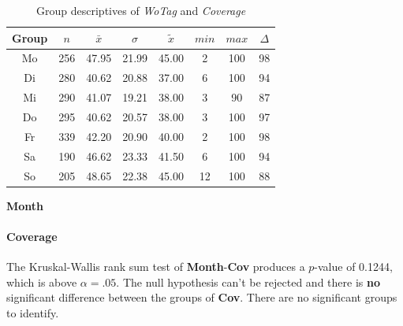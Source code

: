 \begin{table}[ht]
	\small
	\centering
    \begin{tabular}{c|c|c|c|c|c|c|c}
        \toprule
        Group & $n$ & $\bar{x}$ & $\sigma$ & $\tilde{x}$ & $min$ & $max$ & $\Delta$ \\ 
        \midrule
        Mo & 256 & 47.95 & 21.99 & 45.00 & 2  & 100 & 98 \\ 
        Di & 280 & 40.62 & 20.88 & 37.00 & 6  & 100 & 94 \\ 
        Mi & 290 & 41.07 & 19.21 & 38.00 & 3  & 90  & 87 \\ 
        Do & 295 & 40.62 & 20.57 & 38.00 & 3  & 100 & 97 \\ 
        Fr & 339 & 42.20 & 20.90 & 40.00 & 2  & 100 & 98 \\ 
        Sa & 190 & 46.62 & 23.33 & 41.50 & 6  & 100 & 94 \\ 
        So & 205 & 48.65 & 22.38 & 45.00 & 12 & 100 & 88 \\ 
        \bottomrule
      \end{tabular}
	\caption{Group descriptives of \textit{WoTag} and \textit{Coverage}}
	\label{tbl:descriptives_baysis_matched_WoTag_Cov}
\end{table}

\Large
\centerline{\textbf{Month}}
\normalsize

\paragraph{Coverage}
The Kruskal-Wallis rank sum test of \textbf{Month}-\textbf{Cov} produces a $p$-value of 0.1244, which is above $\alpha=.05$. The null hypothesis can't be rejected and there is \textbf{no} significant difference between the groups of \textbf{Cov}. There are no significant groups to identify.

\pagebreak